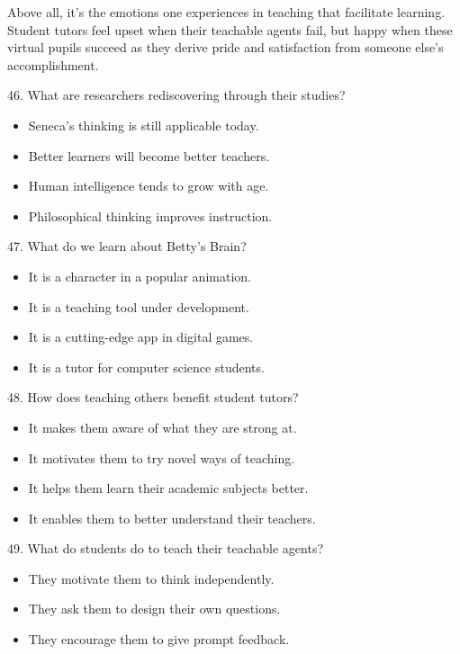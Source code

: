 \documentclass[UTF8,11pt]{ctexart}
\begin{document}
Above all, it's the emotions one experiences in teaching that facilitate learning. Student tutors feel upset when their teachable agents fail, but happy when these virtual pupils succeed as they derive pride and satisfaction from someone else's accomplishment.


46. What are researchers rediscovering through their studies?


\begin{itemize}[leftmargin=2em,itemsep=.2em,topsep=.4em]\item[A.] Seneca's thinking is still applicable today.
\item[B.] Better learners will become better teachers.
\item[C.] Human intelligence tends to grow with age.
\item[D.] Philosophical thinking improves instruction.
\end{itemize}

47. What do we learn about Betty's Brain?


\begin{itemize}[leftmargin=2em,itemsep=.2em,topsep=.4em]\item[A.] It is a character in a popular animation.
\item[B.] It is a teaching tool under development.
\item[C.] It is a cutting-edge app in digital games.
\item[D.] It is a tutor for computer science students.
\end{itemize}

48. How does teaching others benefit student tutors?


\begin{itemize}[leftmargin=2em,itemsep=.2em,topsep=.4em]\item[A.] It makes them aware of what they are strong at.
\item[B.] It motivates them to try novel ways of teaching.
\item[C.] It helps them learn their academic subjects better.
\item[D.] It enables them to better understand their teachers.
\end{itemize}

49. What do students do to teach their teachable agents?


\begin{itemize}[leftmargin=2em,itemsep=.2em,topsep=.4em]\item[A.] They motivate them to think independently.
\item[B.] They ask them to design their own questions.
\item[C.] They encourage them to give prompt feedback.
\end{itemize}
\end{document}
